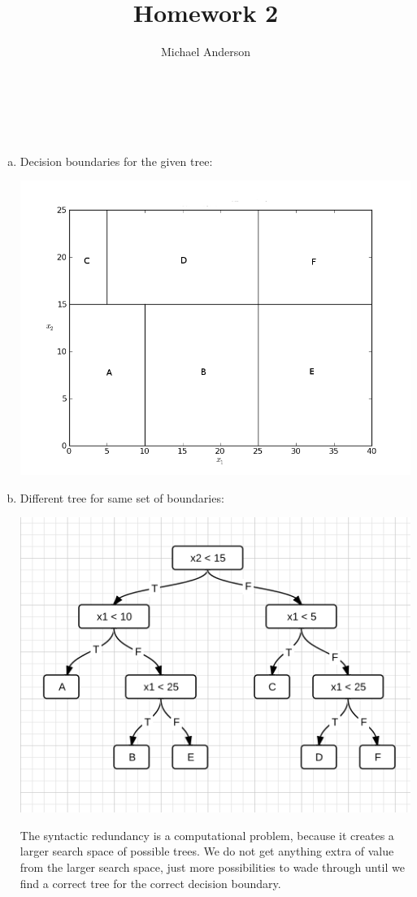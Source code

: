 \documentclass{article}
\author{Michael Anderson}
\title{Homework 2}
\begin{document}
\maketitle
{}
\\
\flushleft
\newpage

\section{}
\begin{enumerate}[(a)]
\item
Decision boundaries for the given tree:

\includegraphics[scale=0.5]{prob1a.png}

\item
Different tree for same set of boundaries:

\includegraphics[scale=0.65]{prob1b.png}

The syntactic redundancy is a computational problem, because it creates a
larger search space of possible trees. We do not get anything extra of value
from the larger search space, just more possibilities to wade through until
we find a correct tree for the correct decision boundary. 
\end{enumerate}
\end{document}
